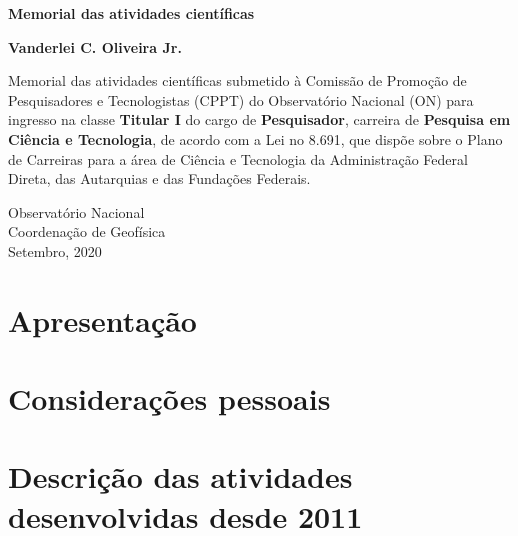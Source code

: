 \documentclass{serrapilheira}
\begin{document}
	
\begin{titlepage}
	\begin{center}
		\vspace*{3cm}
		
		\LARGE
		\textbf{Memorial das atividades científicas}
		
		\vspace{2.5cm}
		\large
		\textbf{Vanderlei C. Oliveira Jr.}
		
		\hspace{.45\textwidth}
		\begin{minipage}{.5\textwidth}
			\vspace{3.0cm}
			\normalsize
			Memorial das atividades científicas submetido à Comissão de Promoção de
			Pesquisadores e Tecnologistas (CPPT) do Observatório Nacional (ON) para
			ingresso na classe \textbf{Titular I} do cargo de \textbf{Pesquisador},  
			carreira de \textbf{Pesquisa em Ciência e Tecnologia}, de acordo com 
			a Lei no 8.691, que dispõe sobre o Plano de Carreiras para a área de 
			Ciência e Tecnologia da Administração Federal Direta, das Autarquias e 
			das Fundações Federais.
		\end{minipage}%
		\vspace*{\fill}
		
		
		\vspace{0.8cm}
		
		\small
		Observatório Nacional\\
		Coordenação de Geofísica \\
		Setembro, 2020
		
	\end{center}
\end{titlepage}

\tableofcontents

\newpage
\chapter{Apresentação}
\renewcommand\refname{}


\newpage
\chapter{Considerações pessoais}
\renewcommand\refname{}


\chapter{Descrição das atividades desenvolvidas desde 2011}
\renewcommand\refname{}



\newpage
\renewcommand\bibname{Produção científica total}

\end{document}
